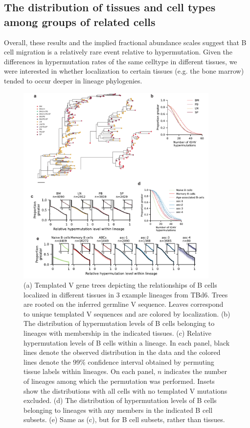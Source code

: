 
\subsection{The distribution of tissues and cell types among groups of related cells}
 Overall, these results and the implied fractional abundance scales suggest that B cell migration is a relatively rare event relative to hypermutation. Given the differences in hypermutation rates of the same celltype in different tissues, we were interested in whether localization to certain tissues (e.g. the bone marrow) tended to occur deeper in lineage phylogenies. 

\begin{figure}
    \centering
    \includegraphics[width=10cm, keepaspectratio]{figs/Tabula_Bursa/Figure5_revised.pdf}
    \caption[Relationships between related cells.]{(a) Templated V gene trees depicting the relationships of B cells localized in different tissues in 3 example lineages from TBd6. Trees are rooted on the inferred germline V sequence. Leaves correspond to unique templated V sequences and are colored by localization. (b) The distribution of hypermutation levels of B cells belonging to lineages with membership in the indicated tissues. (c) Relative hypermutation levels of B cells within a lineage. In each panel, black lines denote the observed distribution in the data and the colored lines denote the 99\% confidence interval obtained by permuting tissue labels within lineages. On each panel, $n$ indicates the number of lineages among which the permutation was performed. Insets show the distributions with all cells with no templated V mutations excluded.  (d) The distribution of hypermutation levels of B cells belonging to lineages with any members in the indicated B cell subsets. (e) Same as (c), but for B cell subsets, rather than tissues. }

\label{fig:phylogenetic-relationships}
    
\end{figure}


